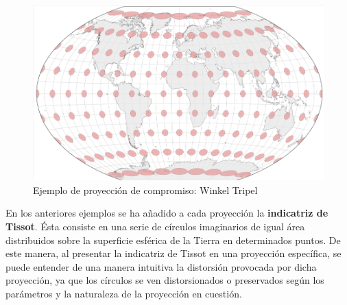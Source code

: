 \documentclass[
]{report}
\begin{document}
\begin{figure}

{\centering \includegraphics[width=0.3\linewidth]{img/comp} 

}

\caption{Ejemplo de proyección de compromiso: Winkel Tripel}\label{fig:comp}
\end{figure}

En los anteriores ejemplos se ha añadido a cada proyección la \textbf{indicatriz de
Tissot}. Ésta consiste en una serie de círculos imaginarios de igual área
distribuidos sobre la superficie esférica de la Tierra en determinados puntos.
De este manera, al presentar la indicatriz de Tissot en una proyección
específica, se puede entender de una manera intuitiva la distorsión provocada
por dicha proyección, ya que los círculos se ven distorsionados o preservados
según los parámetros y la naturaleza de la proyección en cuestión.

  
\end{document}
